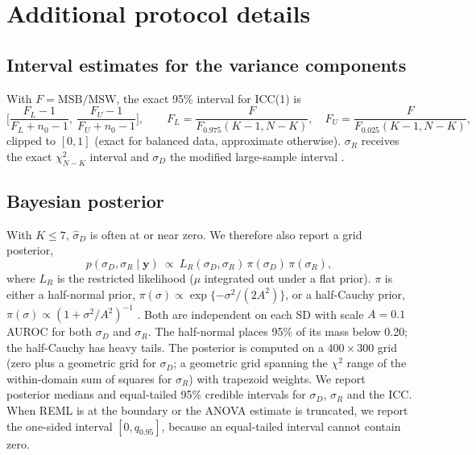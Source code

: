 \section{Additional protocol details}
\label{sup:protocol}

\subsection{Interval estimates for the variance components}
\label{sup:intervals}

With $F=\mathrm{MSB}/\mathrm{MSW}$, the exact 95\%
interval for ICC(1) \citep{searle1992variance,mcgraw1996icc} is
\begin{equation}
  \Big[\frac{F_L-1}{F_L+n_0-1},\ \frac{F_U-1}{F_U+n_0-1}\Big],\qquad
  F_L=\frac{F}{F_{0.975}(K-1,N-K)},\quad F_U=\frac{F}{F_{0.025}(K-1,N-K)},
  \label{eq:iccci}
\end{equation}
clipped to $[0,1]$ (exact for balanced data, approximate otherwise).
$\sigma_R$ receives the exact $\chi^2_{N-K}$ interval and $\sigma_D$ the
modified large-sample interval
\citep[\S3.3]{burdick1992confidence}.


\subsection{Bayesian posterior}
\label{sup:bayes}

With $K\le7$, $\hat\sigma_D$ is often at or
near zero. We therefore also report a grid posterior,
\begin{equation}
  p(\sigma_D,\sigma_R\mid \mathbf y)\ \propto\ L_R(\sigma_D,\sigma_R)\,
  \pi(\sigma_D)\,\pi(\sigma_R),
  \label{eq:posterior}
\end{equation}
where $L_R$ is the restricted likelihood ($\mu$ integrated out under a flat
prior). $\pi$ is either a half-normal prior,
$\pi(\sigma)\propto\exp\{-\sigma^2/(2A^2)\}$, or a half-Cauchy prior,
$\pi(\sigma)\propto(1+\sigma^2/A^2)^{-1}$ \citep{gelman2006prior}. Both are
independent on each SD with scale $A=0.1$ AUROC for both $\sigma_D$ and
$\sigma_R$. The half-normal places 95\% of its mass below 0.20; the half-Cauchy
has heavy tails. The posterior is computed on a $400\times300$ grid (zero plus
a geometric grid for $\sigma_D$; a geometric grid spanning the $\chi^2$ range of
the within-domain sum of squares for $\sigma_R$) with trapezoid weights. We
report posterior medians and equal-tailed 95\% credible intervals for
$\sigma_D$, $\sigma_R$ and the ICC. When REML is at the boundary or the ANOVA
estimate is truncated, we report the one-sided interval $[0,q_{0.95}]$, because
an equal-tailed interval cannot contain zero.


